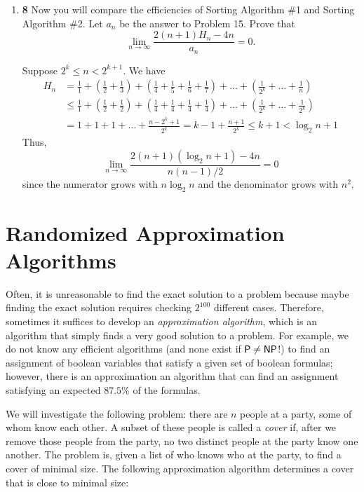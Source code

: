 \documentclass[12pt]{article}
\theoremstyle{plain}
\theoremstyle{definition}
\theoremstyle{remark}
\newcommand{\pts}[1]{\lbrack\textbf{#1}\rbrack}
\begin{document}
\begin{enumerate}
\item \pts{8} Now you will compare the efficiencies of Sorting Algorithm \#1 and Sorting Algorithm \#2. Let $a_n$ be the answer to Problem 15. Prove that \[\lim_{n\to\infty}\frac{2(n+1)H_n-4n}{a_n}=0.\]

\begin{tcolorbox}
Suppose $2^k\le n<2^{k+1}$. We have \begin{align*}H_n&=\frac11+\left(\frac12+\frac13\right)+\left(\frac14+\frac15+\frac16+\frac17\right)+\dots+\left(\frac1{2^k}+\dots+\frac1n\right)\\&\le\frac11+\left(\frac12+\frac12\right)+\left(\frac14+\frac14+\frac14+\frac14\right)+\dots+\left(\frac1{2^k}+\dots+\frac1{2^k}\right)\\&=1+1+1+\dots+\frac{n-2^k+1}{2^k}=k-1+\frac{n+1}{2^k}\le k+1<\log_2n+1\end{align*} Thus, \[\lim_{n\to\infty}\frac{2(n+1)(\log_2n+1)-4n}{n(n-1)/2}=0\] since the numerator grows with $n\log_2n$ and the denominator grows with $n^2$.
\end{tcolorbox}
\end{enumerate}

\section{Randomized Approximation Algorithms}

Often, it is unreasonable to find the exact solution to a problem because maybe finding the exact solution requires checking $2^{100}$ different cases. Therefore, sometimes it suffices to develop an \emph{approximation algorithm}, which is an algorithm that simply finds a very good solution to a problem. For example, we do not know any efficient algorithms (and none exist if ${\sf P}\neq{\sf NP}$!) to find an assignment of boolean variables that satisfy a given set of boolean formulas; however, there is an approximation an algorithm that can find an assignment satisfying an expected $87.5\%$ of the formulas.

We will investigate the following problem: there are $n$ people at a party, some of whom know each other. A subset of these people is called a \emph{cover} if, after we remove those people from the party, no two distinct people at the party know one another. The problem is, given a list of who knows who at the party, to find a cover of minimal size. The following approximation algorithm determines a cover that is close to minimal size:

\newpage
\end{document}
